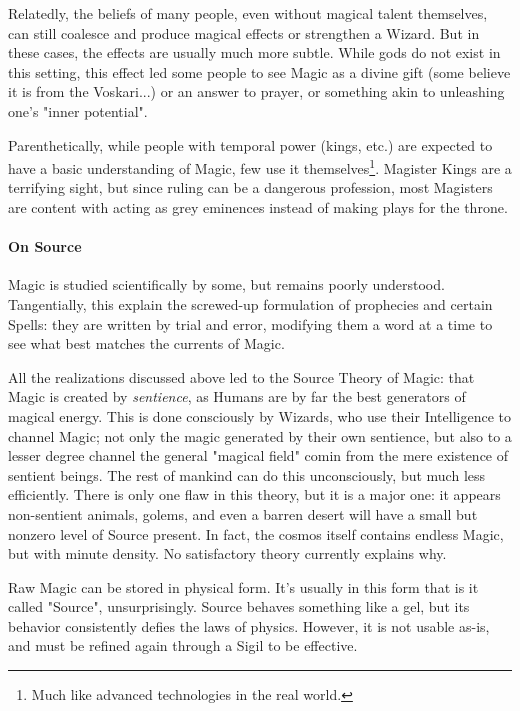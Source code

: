 Relatedly, the beliefs of many people, even without magical talent themselves, can still coalesce and produce magical effects or strengthen a Wizard. But in these cases, the effects are usually much more subtle. While gods do not exist in this setting, this effect led some people to see Magic as a divine gift (some believe it is from the Voskari...) or an answer to prayer, or something akin to unleashing one's "inner potential".

Parenthetically, while people with temporal power (kings, etc.) are expected to have a basic understanding of Magic, few use it themselves\footnote{Much like advanced technologies in the real world.}. Magister Kings are a terrifying sight, but since ruling can be a dangerous profession, most Magisters are content with acting as grey eminences instead of making plays for the throne.



\paragraph{On Source}

Magic is studied scientifically by some, but remains poorly understood. Tangentially, this explain the screwed-up formulation of prophecies and certain Spells: they are written by trial and error, modifying them a word at a time to see what best matches the currents of Magic. 

All the realizations discussed above led to the Source Theory of Magic: that Magic is created by \textit{sentience}, as Humans are by far the best generators of magical energy. This is done consciously by Wizards, who use their Intelligence to channel Magic; not only the magic generated by their own sentience, but also to a lesser degree channel the general "magical field" comin from the mere existence of sentient beings. The rest of mankind can do this unconsciously, but much less efficiently. There is only one flaw in this theory, but it is a major one: it appears non-sentient animals, golems, and even a barren desert will have a small but nonzero level of Source present. In fact, the cosmos itself contains endless Magic, but with minute density. No satisfactory theory currently explains why.

Raw Magic can be stored in physical form. It's usually in this form that is it called "Source", unsurprisingly. Source behaves something like a gel, but its behavior consistently defies the laws of physics. However, it is not usable as-is, and must be refined again through a Sigil to be effective.


